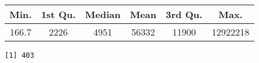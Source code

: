 \documentclass[]{book}
\newenvironment{Shaded}{\begin{snugshade}}{\end{snugshade}}
\newcommand{\KeywordTok}[1]{\textcolor[rgb]{0.13,0.29,0.53}{\textbf{#1}}}
\newcommand{\OperatorTok}[1]{\textcolor[rgb]{0.81,0.36,0.00}{\textbf{#1}}}
\newcommand{\NormalTok}[1]{#1}
\theoremstyle{definition}
\theoremstyle{definition}
\theoremstyle{definition}
\theoremstyle{remark}
\begin{document}
\begin{longtable}[]{@{}cccccc@{}}
\toprule
\begin{minipage}[b]{0.09\columnwidth}\centering\strut
Min.\strut
\end{minipage} & \begin{minipage}[b]{0.12\columnwidth}\centering\strut
1st Qu.\strut
\end{minipage} & \begin{minipage}[b]{0.10\columnwidth}\centering\strut
Median\strut
\end{minipage} & \begin{minipage}[b]{0.09\columnwidth}\centering\strut
Mean\strut
\end{minipage} & \begin{minipage}[b]{0.12\columnwidth}\centering\strut
3rd Qu.\strut
\end{minipage} & \begin{minipage}[b]{0.12\columnwidth}\centering\strut
Max.\strut
\end{minipage}\tabularnewline
\midrule
\endhead
\begin{minipage}[t]{0.09\columnwidth}\centering\strut
166.7\strut
\end{minipage} & \begin{minipage}[t]{0.12\columnwidth}\centering\strut
2226\strut
\end{minipage} & \begin{minipage}[t]{0.10\columnwidth}\centering\strut
4951\strut
\end{minipage} & \begin{minipage}[t]{0.09\columnwidth}\centering\strut
56332\strut
\end{minipage} & \begin{minipage}[t]{0.12\columnwidth}\centering\strut
11900\strut
\end{minipage} & \begin{minipage}[t]{0.12\columnwidth}\centering\strut
12922218\strut
\end{minipage}\tabularnewline
\bottomrule
\end{longtable}

\begin{Shaded}
\end{Shaded}

\begin{verbatim}
[1] 403
\end{verbatim}
\end{document}
